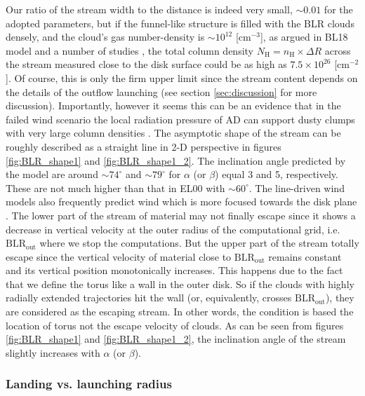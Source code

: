 \documentclass[twocolumn]{aastex62}
\begin{document}
Our ratio of the stream width to the distance is indeed very small, $\sim 0.01$ for the adopted parameters, but if the funnel-like structure is filled with the BLR clouds densely, and the cloud's gas number-density is $\sim 10^{12}$ [cm$^{-3}$], as argued in BL18 model and a number of studies \citep[e.g.][]{tek2016, panda2018, adhikari2019book}, the total column density $N_{\mathrm{H}} = n_{\mathrm{H}} \times \Delta R $ across the stream measured close to the disk surface could be as high as $7.5 \times 10^{26}$ [cm$^{-2}$]. Of course, this is only the firm upper limit since the stream content depends on the details of the outflow launching (see section \ref{sec:discussion} for more discussion).
Importantly, however it seems this can be an evidence that in the failed wind scenario the local radiation pressure of AD can support dusty clumps with very large column densities \citep{netzer2015}.
The asymptotic shape of the stream can be roughly described as a straight line in 2-D perspective in figures \ref{fig:BLR_shape1} and \ref{fig:BLR_shape1_2}. The inclination angle predicted by the model are around $\sim 74^{\circ}$ and $\sim 79^{\circ}$ for $\alpha$ (or $\beta$) equal 3 and 5, respectively. These are not much higher than that in EL00 with $\sim 60^{\circ}$. The line-driven wind models also frequently predict wind which is more focused towards the disk plane \citep[e.g.][]{higginbottom2014}. The lower part of the stream of material may not finally escape since it shows a decrease in vertical velocity at the outer radius of the computational grid, i.e. $\mathrm{BLR}_{\mathrm{out}}$ where we stop the computations. But the upper part of the stream totally escape since the vertical velocity of material close to $\mathrm{BLR}_{\mathrm{out}}$ remains constant and its vertical position monotonically increases. This happens due to the fact that we define the torus like a wall in the outer disk. So if the clouds with highly radially extended trajectories hit the wall (or, equivalently, crosses $\mathrm{BLR}_{\mathrm{out}}$), they are considered as the escaping stream. In other words, the condition is based the location of torus not the escape velocity of clouds. As can be seen from figures \ref{fig:BLR_shape1} and \ref{fig:BLR_shape1_2}, the inclination angle of the stream slightly increases with $\alpha$ (or $\beta$).

\subsubsection{Landing vs. launching radius}
\label{sect:land}
\end{document}
